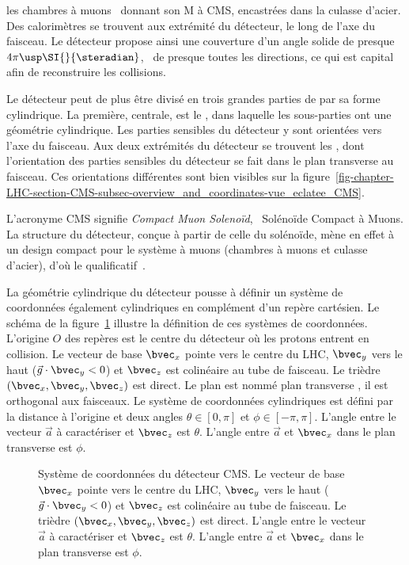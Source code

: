 les chambres à muons~\cite{CERN-LHCC-97-032} donnant son \og M \fg{} à CMS, encastrées dans la culasse d'acier.
Des calorimètres \og \CMSforwards \fg{} se trouvent aux extrémité du détecteur, le long de l'axe du faisceau.
Le détecteur propose ainsi une couverture d'un angle solide de presque $4\pi\usp\SI{}{\steradian}$, \ie\ de presque toutes les directions, ce qui est capital afin de reconstruire les collisions.
\par Le détecteur peut de plus être divisé en trois grandes parties de par sa forme cylindrique.
La première, centrale, est le \og \CMSbarrel \fg, dans laquelle les sous-parties ont une géométrie cylindrique.
Les parties sensibles du détecteur y sont orientées vers l'axe du faisceau.
Aux deux extrémités du détecteur se trouvent les \og \CMSendcaps \fg, dont l'orientation des parties sensibles du détecteur se fait dans le plan transverse au faisceau.
Ces orientations différentes sont bien visibles sur la figure~\ref{fig-chapter-LHC-section-CMS-subsec-overview_and_coordinates-vue_eclatee_CMS}.
\par L'acronyme CMS signifie \emph{Compact Muon Solenoïd}, \ie\ Solénoïde Compact à Muons.
La structure du détecteur, conçue à partir de celle du solénoïde, mène en effet à un design compact pour le système à muons (chambres à muons et culasse d'acier), d'où le qualificatif~\cite{cms_letter_intent}.
\par La géométrie cylindrique du détecteur pousse à définir un système de coordonnées également cylindriques en complément d'un repère cartésien.
Le schéma de la figure~\ref{fig-chapter-LHC-section-CMS-subsec-overview_and_coordinates-CMS_3D_phi_theta_defs} illustre la définition de ces systèmes de coordonnées.
L'origine $O$ des repères est le centre du détecteur où les protons entrent en collision.
Le vecteur de base $\bvec_x$ pointe vers le centre du LHC,
$\bvec_y$ vers le haut ($\vec{g}\cdot\bvec_y<0$) et
$\bvec_z$ est colinéaire au tube de faisceau.
Le trièdre $(\bvec_x, \bvec_y, \bvec_z)$ est direct.
Le plan  est nommé \og plan transverse \fg, il est orthogonal aux faisceaux.
Le système de coordonnées cylindriques est défini par la distance à l'origine et deux angles $\theta\in[0,\pi]$ et $\phi\in[-\pi,\pi]$.
L'angle entre le vecteur $\vec{a}$ à caractériser et $\bvec_z$ est $\theta$.
L'angle entre $\vec{a}$ et $\bvec_x$ dans le plan transverse est $\phi$.
\begin{figure}[h]
\centering

\caption[Système de coordonnées du détecteur CMS.]{Système de coordonnées du détecteur CMS.
Le vecteur de base $\bvec_x$ pointe vers le centre du LHC,
$\bvec_y$ vers le haut ($\vec{g}\cdot\bvec_y<0$) et
$\bvec_z$ est colinéaire au tube de faisceau.
Le trièdre $(\bvec_x, \bvec_y, \bvec_z)$ est direct.
L'angle entre le vecteur $\vec{a}$ à caractériser et $\bvec_z$ est $\theta$.
L'angle entre $\vec{a}$ et $\bvec_x$ dans le plan transverse est $\phi$.}
\label{fig-chapter-LHC-section-CMS-subsec-overview_and_coordinates-CMS_3D_phi_theta_defs}
\end{figure}
